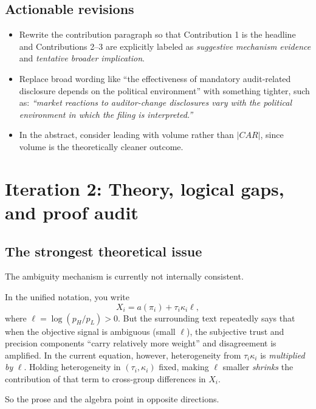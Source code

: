 \documentclass[11pt]{article}
\begin{document}
\subsection*{Actionable revisions}
\begin{itemize}
    \item Rewrite the contribution paragraph so that Contribution 1 is the headline and Contributions 2--3 are explicitly labeled as \emph{suggestive mechanism evidence} and \emph{tentative broader implication}.
    \item Replace broad wording like ``the effectiveness of mandatory audit-related disclosure depends on the political environment'' with something tighter, such as: \emph{``market reactions to auditor-change disclosures vary with the political environment in which the filing is interpreted.''}
    \item In the abstract, consider leading with volume rather than $|CAR|$, since volume is the theoretically cleaner outcome.
\end{itemize}

\section*{Iteration 2: Theory, logical gaps, and proof audit}

\subsection*{The strongest theoretical issue}
The ambiguity mechanism is currently not internally consistent.

In the unified notation, you write
\[
X_i = a(\pi_i) + \tau_i \kappa_i \ell,
\]
where $\ell = \log(p_H/p_L) > 0$. But the surrounding text repeatedly says that when the objective signal is ambiguous (small $\ell$), the subjective trust and precision components ``carry relatively more weight'' and disagreement is amplified. In the current equation, however, heterogeneity from $\tau_i\kappa_i$ is \emph{multiplied by} $\ell$. Holding heterogeneity in $(\tau_i,\kappa_i)$ fixed, making $\ell$ smaller \emph{shrinks} the contribution of that term to cross-group differences in $X_i$.

So the prose and the algebra point in opposite directions.
\end{document}
